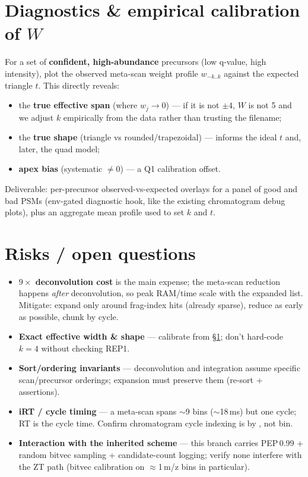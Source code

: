 \documentclass[11pt]{article}
\newcommand{\code}[1]{\texttt{\detokenize{#1}}}
\begin{document}
\section{Diagnostics \& empirical calibration of $W$}\label{sec:calib}
For a set of \textbf{confident, high-abundance} precursors (low q-value, high intensity), plot the
observed meta-scan weight profile $w_{-k..k}$ against the expected triangle $t$. This directly reveals:
\begin{itemize}[leftmargin=*,itemsep=0pt]
\item the \textbf{true effective span} (where $w_j\to0$) --- if it is not $\pm4$, $W$ is not 5 and we
adjust $k$ empirically from the data rather than trusting the filename;
\item the \textbf{true shape} (triangle vs rounded/trapezoidal) --- informs the ideal $t$ and, later, the
quad model;
\item \textbf{apex bias} (systematic \code{tri_apex_offset}$\ne0$) --- a Q1 calibration offset.
\end{itemize}
Deliverable: per-precursor observed-vs-expected overlays for a panel of good and bad PSMs (env-gated
diagnostic hook, like the existing chromatogram debug plots), plus an aggregate mean profile used to set
$k$ and $t$.

\section{Risks / open questions}\label{sec:risks}
\begin{itemize}[leftmargin=*,itemsep=1pt]
\item \textbf{$9\times$ deconvolution cost} is the main expense; the meta-scan reduction happens
\emph{after} deconvolution, so peak RAM/time scale with the expanded list. Mitigate: expand only around
frag-index hits (already sparse), reduce as early as possible, chunk by cycle.
\item \textbf{Exact effective width \& shape} --- calibrate from \S\ref{sec:calib}; don't hard-code
$k=4$ without checking REP1.
\item \textbf{Sort/ordering invariants} --- deconvolution and integration assume specific scan/precursor
orderings; expansion must preserve them (re-sort + assertions).
\item \textbf{iRT / cycle timing} --- a meta-scan spans $\sim$9 bins ($\sim$18\,ms) but one cycle; RT is
the cycle time. Confirm chromatogram cycle indexing is by \code{cycle_idx}, not bin.
\item \textbf{Interaction with the inherited scheme} --- this branch carries PEP\,0.99 + random bitvec
sampling + candidate-count logging; verify none interfere with the ZT path (bitvec calibration on
$\approx$1\,m/z bins in particular).
\end{itemize}
\end{document}
